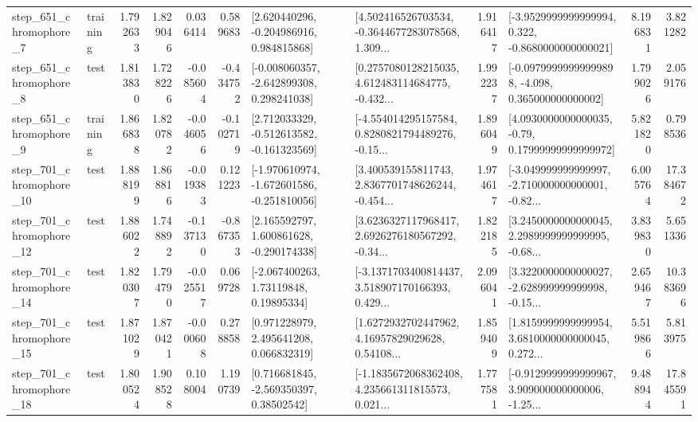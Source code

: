 \begin{tabular}{llrrrrllrlrr}
   step\_651\_chromophore\_7 &  training &      1.792633 &    1.829046 &      0.036414 &  0.589683 &    [2.620440296, -0.204986916, 0.984815868] &  [4.502416526703534, -0.3644677283078568, 1.309... &       1.916417 &  [-3.9529999999999994, 0.322, -0.8680000000000021] &            8.196831 &          3.821282 \\
   step\_651\_chromophore\_8 &      test &      1.813830 &    1.728226 &     -0.085604 & -0.434752 &   [-0.008060357, -2.642899308, 0.298241038] &  [0.2757080128215035, 4.612483114684775, -0.432... &       1.992237 &  [-0.09799999999999898, -4.098, 0.365000000000002] &            1.799026 &          2.059176 \\
   step\_651\_chromophore\_9 &  training &      1.866838 &    1.820782 &     -0.046056 & -0.102719 &   [2.712033329, -0.512613582, -0.161323569] &  [-4.554014295157584, 0.8280821794489276, -0.15... &       1.896049 &   [4.0930000000000035, -0.79, 0.17999999999999972] &            5.821820 &          0.798536 \\
  step\_701\_chromophore\_10 &      test &      1.888199 &    1.868816 &     -0.019383 &  0.121223 &  [-1.970610974, -1.672601586, -0.251810056] &  [3.400539155811743, 2.8367701748626244, -0.454... &       1.974617 &  [-3.049999999999997, -2.710000000000001, -0.82... &            6.005764 &         17.384672 \\
  step\_701\_chromophore\_12 &      test &      1.886022 &    1.748892 &     -0.137130 & -0.867353 &    [2.165592797, 1.600861628, -0.290174338] &  [3.6236327117968417, 2.6926276180567292, -0.34... &       1.822185 &  [3.2450000000000045, 2.2989999999999995, -0.68... &            3.839830 &          5.651336 \\
  step\_701\_chromophore\_14 &      test &      1.820307 &    1.794790 &     -0.025517 &  0.069728 &      [-2.067400263, 1.73119848, 0.19895334] &  [-3.1371703400814437, 3.518907170166393, 0.429... &       2.096041 &  [3.3220000000000027, -2.628999999999998, -0.15... &            2.659467 &         10.383696 \\
  step\_701\_chromophore\_15 &      test &      1.871029 &    1.870421 &     -0.000608 &  0.278858 &     [0.971228979, 2.495641208, 0.066832319] &  [1.6272932702447962, 4.16957829029628, 0.54108... &       1.859409 &  [1.8159999999999954, 3.6810000000000045, 0.272... &            5.519866 &          5.813975 \\
  step\_701\_chromophore\_18 &      test &      1.800524 &    1.908528 &      0.108004 &  1.190739 &     [0.716681845, -2.569350397, 0.38502542] &  [-1.1835672068362408, 4.235661311815573, 0.021... &       1.777581 &  [-0.9129999999999967, 3.909000000000006, -1.25... &            9.488944 &         17.845591 \\

\end{tabular}
